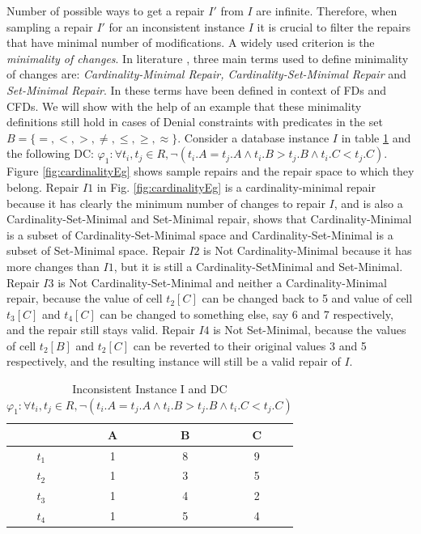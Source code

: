 Number of possible ways to get a repair $I'$ from $I$ are infinite.
Therefore, when sampling a repair $I'$ for an inconsistent instance $I$ it is crucial to filter the repairs that have minimal number of modifications.
A widely used criterion is the \textit{minimality of changes}.
In literature \cite{Bohannon,Kolahi,Chomicki,Greco,Beskales_sampling}, three main terms used to define minimality of changes are:
\textit{Cardinality-Minimal Repair, Cardinality-Set-Minimal Repair} and \textit{ Set-Minimal Repair}.
In \cite{Beskales_journal} these terms have been defined in context of FDs and CFDs.
We will show with the help of an example that these minimality definitions still hold in cases of Denial constraints with predicates in the set $B = \{=, <, >, \neq, \leq, \geq, \approx\}$.
Consider a database instance $I$ in table \ref{tab:eg3} and the following DC: $\varphi _1: \forall t_i,t_j \in R, \neg (t_i.A = t_j.A \wedge t_i.B > t_j.B \wedge t_i.C < t_j.C) $.
Figure \ref{fig:cardinalityEg} shows sample repairs and the repair space to which they belong.
Repair $I1$ in Fig. \ref{fig:cardinalityEg} is a cardinality-minimal repair because it has clearly the minimum number of changes to repair $I$, 
and is also a Cardinality-Set-Minimal and Set-Minimal repair, \cite{Beskales_journal} shows that Cardinality-Minimal is a subset of Cardinality-Set-Minimal space 
and Cardinality-Set-Minimal is a subset of Set-Minimal space.
Repair $I2$ is Not Cardinality-Minimal because it has more changes than $I1$, but it is still a Cardinality-SetMinimal and Set-Minimal.
Repair $I3$ is Not Cardinality-Set-Minimal and neither a Cardinality-Minimal repair, because the value of cell $t_2[C]$ can be changed back to 5 
and value of cell $t_3[C]$ and $t_4[C]$ can be changed to something else, say 6 and 7 respectively, and the repair still stays valid.
Repair $I4$ is Not Set-Minimal, because the values of cell $t_2[B]$ and $t_2[C]$ can be reverted to their original values 3 and 5 respectively, 
and the resulting instance will still be a valid repair of $I$.
\begin{table} \label{tab:eg3}
\centering 
\begin{tabular}{|c|c|c|c|}  \hline
      	 & A & B & C	\\ \hline
   $t_1$ & 1 & 8 & 9 	\\ \hline
   $t_2$ & 1 & 3 & 5  	\\ \hline
   $t_3$ & 1 & 4 & 2 	\\ \hline
   $t_4$ & 1 & 5 & 4 	\\ \hline
\end{tabular}
\caption{Inconsistent Instance I and DC $\varphi _1: \forall t_i,t_j \in R, \neg (t_i.A = t_j.A \wedge t_i.B > t_j.B \wedge t_i.C < t_j.C) $}
\end{table}

